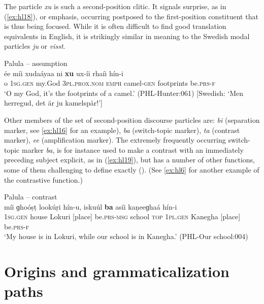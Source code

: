 \documentclass[output=paper]{langsci/langscibook}
\begin{document}
The particle \textit{xu} is such a second-position clitic. It signals surprise, as in ‎(\ref{ex:hl18}), or emphasis, occurring postposed to the first-position constituent that is thus being focused. While it is often difficult to find good translation equivalents in English, it is strikingly similar in meaning to the Swedish modal particles \textit{ju} or \textit{visst}.

\begin{exe}
	\ex Palula -- assumption \label{ex:hl18}\\
	\gll ée míi xudaáyaa ni \textbf{xu} ux-íi rhaíi hín-i\\
	o 1\textsc{sg}.\textsc{gen} my.God 3\textsc{pl}.\textsc{prox}.\textsc{nom} \textsc{emph} camel-\textsc{gen} footprints be.\textsc{prs}-\textsc{f}\\
	\trans ‘O my God, it’s the footprints of a camel.’ (PHL-Hunter:061) [Swedish: ‘Men herregud, det är ju kamelspår!’]
\end{exe}

Other members of the set of second-position discourse particles are: \textit{bi} (separation marker, see \ref{ex:hl16} for an example), \textit{ba} (switch-topic marker), \textit{ta} (contrast marker), \textit{ee} (amplification marker). The extremely frequently occurring switch-topic marker \textit{ba}, is for instance used to make a contrast with an immediately preceding subject explicit, as in ‎(\ref{ex:hl19}), but has a number of other functions, some of them challenging to define exactly (\citealt[419--425]{Liljegren2016}). (See \ref{ex:hl6} for another example of the contrastive function.) 

\begin{exe}
	\ex Palula -- contrast \label{ex:hl19}\\
	\gll míi ɡhoóṣṭ lookúṛi hín-u, iskuúl \textbf{ba} asíi kaṇeeɡhaá hín-i\\
	1\textsc{sg}.\textsc{gen} house {Lokuri [place]} be.\textsc{prs}-\textsc{msg} school \textsc{top} 1\textsc{pl}.\textsc{gen} {Kanegha [place]} be.\textsc{prs}-\textsc{f}\\
	\trans ‘My house is in Lokuri, while our school is in Kanegha.’ (PHL-Our school:004)
\end{exe}


\section{Origins and grammaticalization paths}\label{s:hl6}
\end{document}
